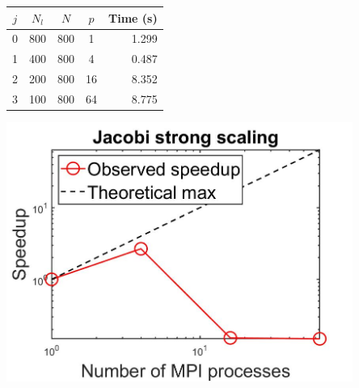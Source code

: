 \begin{questions}
\begin{solution}
    \begin{minipage}{0.46\textwidth}
    \begin{center}
        \begin{tabular}{|c|c|c|c|r|}
        \hline
        $j$ & $N_l$ & $N$ & $p$ & Time (s) \\
        \hline\hline
        0 & 800 & 800 & 1 & 1.299 \\ 
        \hline
        1 & 400 & 800 & 4 & 0.487 \\ 
        \hline
        2 & 200 & 800 & 16 & 8.352 \\ 
        \hline
        3 & 100 & 800 & 64 & 8.775 \\ 
        \hline
        \end{tabular}
        \label{tab:strong_jacobi}
    \end{center}
    \end{minipage}
    \begin{minipage}{0.48\textwidth}
    \begin{center}
        \includegraphics[width=0.85\textwidth]{Images/jacobi_strong_plot.jpg}
        \label{fig:strong_plot}
    \end{center}
    \end{minipage}
\end{solution}







\end{questions}
